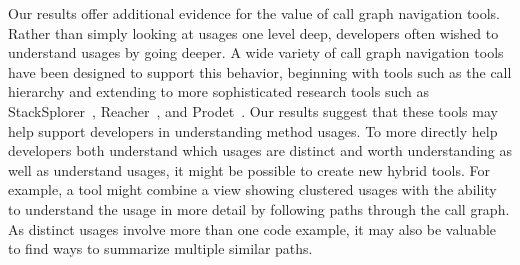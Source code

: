 \documentclass[conference]{IEEEtran}
\begin{document}
Our results offer additional evidence for the value of call graph navigation tools. Rather than simply looking at usages one level deep, developers often wished to understand usages by going deeper. A wide variety of call graph navigation tools have been designed to support this behavior, beginning with tools such as the call hierarchy and extending to more sophisticated research tools such as StackSplorer~\cite{karrer2011stacksplorer}, Reacher~\cite{latoza2011visualizing}, and Prodet~\cite{augustine2015field}. Our results suggest that these tools may help support developers in understanding method usages. To more directly help developers both understand which usages are distinct and worth understanding as well as understand usages, it might be possible to create new hybrid tools. For example, a tool might combine a view showing clustered usages with the ability to understand the usage in more detail by following paths through the call graph. As distinct usages involve more than one code example, it may also be valuable to find ways to summarize multiple similar paths. 




\end{document}
